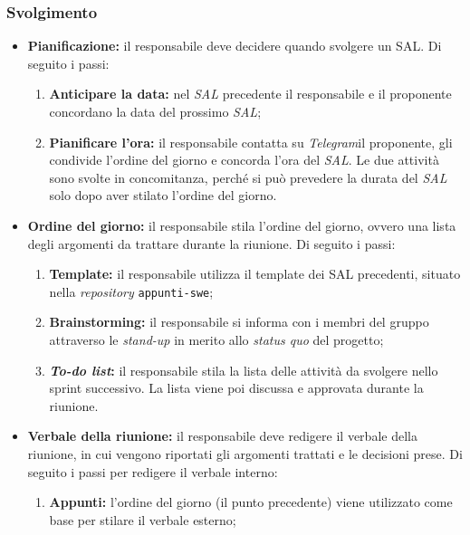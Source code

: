 \subsubsection{Svolgimento}
\begin{itemize}

	\item \textbf{Pianificazione:} il responsabile deve decidere quando svolgere
	      un SAL. Di seguito i passi:
	      \begin{enumerate}
		      \item \textbf{Anticipare la data:} nel \textit{SAL}
		            precedente il responsabile e il proponente concordano
		            la data del prossimo \textit{SAL};

		      \item \textbf{Pianificare l'ora:} il responsabile contatta su
		            \textit{Telegram}\g il proponente, gli condivide l'ordine del
		            giorno e concorda l'ora del \textit{SAL}. Le due attività
		            sono svolte in concomitanza, perché si può prevedere la
		            durata del \textit{SAL} solo dopo aver stilato l'ordine del
		            giorno.
	      \end{enumerate}

	\item \textbf{Ordine del giorno:} il responsabile stila l'ordine del
	      giorno, ovvero una lista degli argomenti da trattare durante la
	      riunione. Di seguito i passi:
	      \begin{enumerate}
		      \item \textbf{Template:} il responsabile utilizza il template
		            dei SAL precedenti, situato nella \textit{repository\g}
		            \texttt{appunti-swe};

		      \item \textbf{Brainstorming:} il responsabile si informa con i
		            membri del gruppo attraverso le \textit{stand-up} in merito
		            allo \textit{status quo} del progetto;

		      \item \textbf{\textit{To-do list}:} il responsabile stila la lista
		            delle attività da svolgere nello sprint successivo. La
		            lista viene poi discussa e approvata durante la riunione.
	      \end{enumerate}

	\item \textbf{Verbale della riunione:} il responsabile deve redigere il
	      verbale della riunione, in cui vengono riportati gli argomenti
	      trattati e le decisioni prese. Di seguito i passi per redigere il
	      verbale interno:
	      \begin{enumerate}
		      \item \textbf{Appunti:} l'ordine del giorno (il punto precedente)
		            viene utilizzato come base per stilare il verbale esterno;


\end{enumerate}
\end{itemize}
